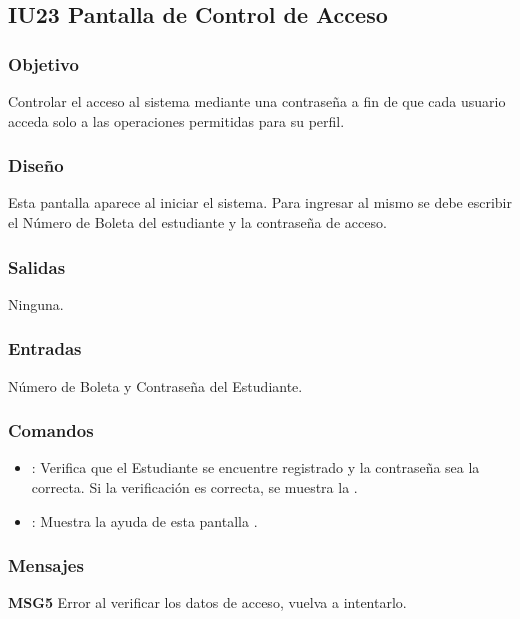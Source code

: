 \subsection{IU23 Pantalla de Control de Acceso}

\subsubsection{Objetivo}
	Controlar el acceso al sistema mediante una contraseña a fin de que cada usuario acceda solo a las operaciones permitidas para su perfil.

\subsubsection{Diseño}
	Esta pantalla aparece al iniciar el sistema. Para ingresar al mismo se debe escribir el Número de Boleta del estudiante y la contraseña de acceso. 


\subsubsection{Salidas}

	Ninguna.

\subsubsection{Entradas}
Número de Boleta y Contraseña del Estudiante.

\subsubsection{Comandos}
\begin{itemize}
	\item {}: Verifica que el Estudiante se encuentre registrado y la contraseña sea la correcta. Si la verificación es correcta, se muestra la .
	\item {}: Muestra la ayuda de esta pantalla .
\end{itemize}

\subsubsection{Mensajes}
	\begin{Citemize}
		\item {\bf MSG5} Error al verificar los datos de acceso, vuelva a intentarlo.
	\end{Citemize}
	
